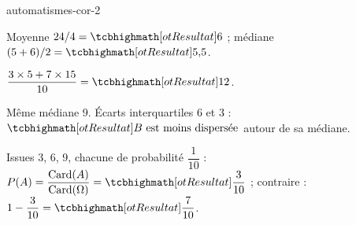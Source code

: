 \begin{blocEdition}{automatismes-cor-2}
\begin{deuxcolonnes}
\begin{questions}
\item \begin{minipage}[t]{\linewidth}\raggedright\leavevmode {}\enspace Moyenne $24/4=\res6$ ; médiane $(5+6)/2=\res{5{,}5}$.\end{minipage}
\item \begin{minipage}[t]{\linewidth}\raggedright\leavevmode {}\enspace $\dfrac{3\times5+7\times15}{10}=\res{12}$.\end{minipage}
\item \begin{minipage}[t]{\linewidth}\raggedright\leavevmode {}\enspace Même médiane 9. Écarts interquartiles 6 et 3 : $\res{B\text{ est moins dispersée}}$ autour de sa médiane.\end{minipage}
\item \begin{minipage}[t]{\linewidth}\raggedright\leavevmode {}\enspace Issues 3, 6, 9, chacune de probabilité $\dfrac1{10}$ : $P(A)=\dfrac{\operatorname{Card}(A)}{\operatorname{Card}(\Omega)}=\res{\dfrac3{10}}$ ; contraire : $1-\dfrac3{10}=\res{\dfrac7{10}}$.\end{minipage}
\end{questions}\end{deuxcolonnes}

\end{blocEdition}
